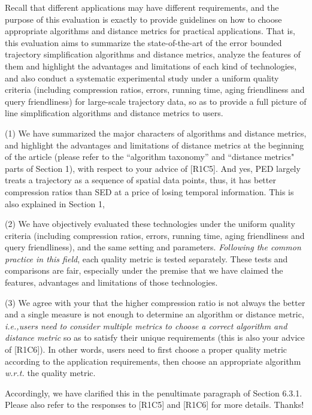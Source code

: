 \documentclass{letter}
\newcommand{\ie}{\emph{i.e.,}\xspace}
\newcommand{\wrt}{\emph{w.r.t.}\xspace}
\begin{document}
Recall that different applications may have different requirements, and the purpose of this evaluation is exactly to
provide guidelines on how to choose appropriate algorithms and distance metrics for practical applications.
That is, this evaluation aims to summarize the state-of-the-art of the error bounded trajectory simplification algorithms and distance metrics, analyze the features of them and highlight the advantages and limitations of each kind of technologies, and also conduct a systematic experimental study under a uniform quality criteria (including compression ratios, errors, running time, aging friendliness and query friendliness) for large-scale trajectory data, so as to provide a full picture of line simplification algorithms and distance metrics to users. 

(1) We have summarized the major characters of algorithms and distance metrics, and highlight the advantages and limitations of distance metrics at the beginning of the article (please refer to the ``algorithm taxonomy'' and ``distance metrics" parts of Section 1), with respect to your advice of [R1C5]. And yes, PED largely treats a trajectory as a sequence of spatial data points, thus, it has better compression ratios than SED at a price of losing temporal information. This is also explained in Section 1,

(2) We have objectively evaluated these technologies under the uniform quality criteria (including compression ratios, errors, running time, aging friendliness and query friendliness), and the same setting and parameters. {\em Following the common practice in this field}, each quality metric is tested separately. These tests and comparisons are fair, especially under the premise that we have claimed the features, advantages and limitations of those technologies. %

(3) We agree with your that the higher compression ratio is not always the better and a single measure is not enough to determine an algorithm or distance metric, \ie \emph{users need to consider multiple metrics to choose a correct algorithm and distance metric} so as to satisfy their unique requirements (this is also your advice of [R1C6]). In other words, users need to first choose a proper quality metric according to the application requirements, then choose an appropriate algorithm \wrt the quality metric.

Accordingly, we have clarified this in the penultimate paragraph of Section 6.3.1. Please also refer to the responses to [R1C5] and [R1C6] for more details. Thanks!
\end{document}
